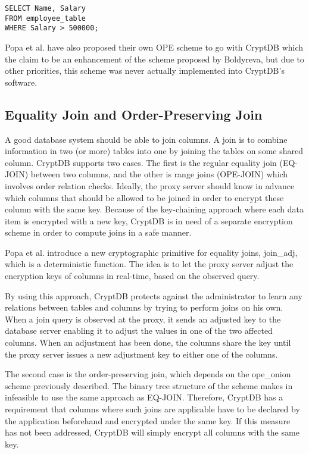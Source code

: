 \begin{verbatim}
SELECT Name, Salary
FROM employee_table
WHERE Salary > 500000;
\end{verbatim}

Popa et al. have also proposed their own OPE scheme to go with CryptDB \cite{CryptDB_OPE_Encoding} which the claim to be an enhancement of the scheme proposed by Boldyreva, but due to other priorities, this scheme was never actually implemented into CryptDB's software.



\subsection{Equality Join and Order-Preserving Join}

A good database system should be able to join columns. A join is to combine information in two (or more) tables into one by joining the tables on some shared column. CryptDB supports two cases. The first is the regular equality join (EQ-JOIN) between two columns, and the other is range joins (OPE-JOIN) which involves order relation checks. Ideally, the proxy server should know in advance which columns that should be allowed to be joined in order to encrypt these column with the same key. Because of the key-chaining approach where each data item is encrypted with a new key, CryptDB is in need of a separate encryption scheme in order to compute joins in a safe manner.

Popa et al. \citep{CryptDB_Main_Paper} introduce a new cryptographic primitive for equality joins, \gls{join_adj}, which is a deterministic function. The idea is to let the proxy server adjust the encryption keys of columns in real-time, based on the observed query.

By using this approach, CryptDB protects against the administrator to learn any relations between tables and columns by trying to perform joins on his own. When a join query is observed at the proxy, it sends an adjusted key to the database server enabling it to adjust the values in one of the two affected columns. When an adjustment has been done, the columns share the key until the proxy server issues a new adjustment key to either one of the columns.

The second case is the order-preserving join, which depends on the \gls{ope_onion} scheme previously described. The binary tree structure of the scheme makes in infeasible to use the same approach as EQ-JOIN. Therefore, CryptDB has a requirement that columns where such joins are applicable have to be declared by the application beforehand and encrypted under the same key. If this measure has not been addressed, CryptDB will simply encrypt all columns with the same key.

